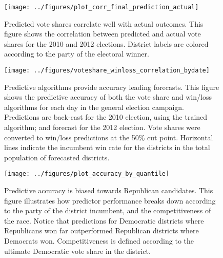 \documentclass{acm_proc_article-sp}
\begin{document}
\begin{figure}[ht]
  \centering
  \texttt{[image: ../figures/plot\_corr\_final\_prediction\_actual]}
  \caption{Predicted vote shares correlate well with actual
    outcomes. This figure shows the correlation between predicted and
    actual vote shares for the 2010 and 2012 elections. District
    labels are colored according to the party of the electoral winner.}
  \label{fig:corr-voteshare}
\end{figure}

\begin{figure*}[ht]
  \centering
  \texttt{[image: ../figures/voteshare\_winloss\_correlation\_bydate]}
  \caption{Predictive algorithms provide accuracy leading
    forecasts. This figure shows the predictive accuracy of both the
    vote share and win/loss algorithms for each day in the general election campaign. Predictions are back-cast for the 2010 election, using the trained algorithm; and forecast for the 2012 election. Vote shares were converted to win/loss predictions at the 50\% cut point. Horizontal lines indicate the incumbent win rate for the districts in the total population of forecasted districts.}
  \label{fig:prediction-corr-bydate}
\end{figure*}




\begin{figure}[ht]
  \centering
  \texttt{[image: ../figures/plot\_accuracy\_by\_quantile]}
  \caption{Predictive accuracy is biased towards Republican
    candidates. This figure illustrates how predictor performance
    breaks down according to the party of the district incumbent, and
    the competitiveness of the race. Notice that predictions for
    Democratic districts where Republicans won far outperformed
    Republican districts where Democrats won. Competitiveness is defined according to the ultimate Democratic vote share in the district. }
  \label{fig:accuracy-by-competitiveness}
\end{figure}

\end{document}
